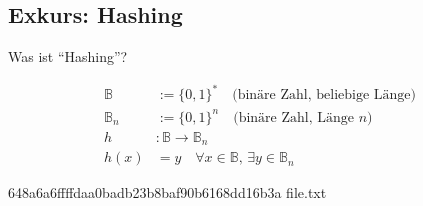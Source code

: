 \subsection{Exkurs: Hashing}\label{subsec:exkurs:-hashing}

\begin{frame}[c]
    \slidehead
    \Huge
    \centering
    Was ist \enquote{Hashing}?
\end{frame}

\begin{frame}[c]
    \slidehead
    \centering
    {
        \Large
    }
    \begin{align*}
        \mathbb{B}   & := \{0, 1\}^* \quad \text{(binäre Zahl, beliebige Länge)}         \\
        \mathbb{B}_n & := \{0, 1\}^n \quad \text{(binäre Zahl, Länge $n$)}               \\
        h            & : \mathbb{B} \rightarrow \mathbb{B}_n                             \\
        h(x)         & = y \quad \forall x \in \mathbb{B}, \, \exists y \in \mathbb{B}_n
    \end{align*}
\end{frame}

\begin{frame}[c, fragile]
    \slidehead
    \centering
    \begin{codeBlock}[]{}
        648a6a6ffffdaa0badb23b8baf90b6168dd16b3a  file.txt
    \end{codeBlock}
\end{frame}

\begin{frame}[c]
    \slidehead
    \centering
    {
        \Large
    }
\end{frame}
